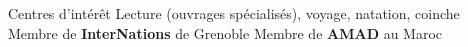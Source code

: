 \begin{rubric}{Centres d’intérêt}
\entry*[Loisirs] 
Lecture (ouvrages spécialisés), voyage, natation, coinche %
\entry*[Activités] 
Membre de \textbf{InterNations} de Grenoble
\entry*[]
Membre de \textbf{AMAD} au Maroc
\end{rubric}

